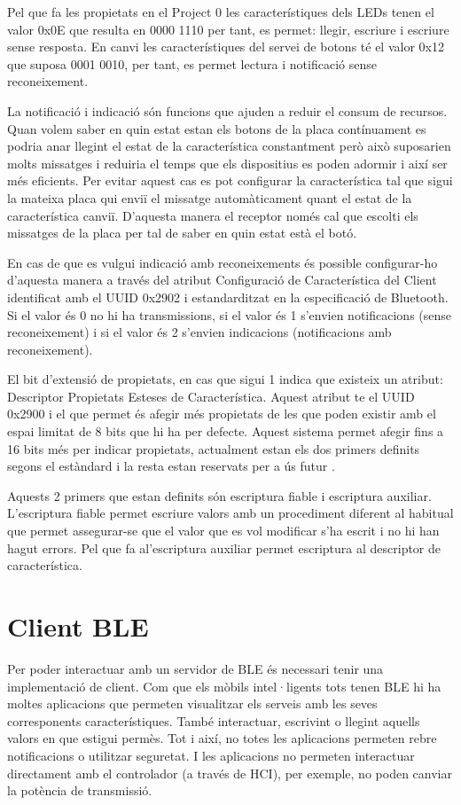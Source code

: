 Pel que fa les propietats en el Project 0 les característiques dels LEDs tenen el valor 0x0E que resulta en 0000 1110 per tant, es permet: llegir, escriure i escriure sense resposta.
En canvi les característiques del servei de botons té el valor 0x12 que suposa 0001 0010, per tant, es permet lectura i notificació sense reconeixement.

La notificació i indicació són funcions que ajuden a reduir el consum de recursos.
Quan volem saber en quin estat estan els botons de la placa contínuament es podria anar llegint el estat de la característica constantment però això suposarien molts missatges i reduiria el temps que els dispositius es poden adormir i així ser més eficients.
Per evitar aquest cas es pot configurar la característica tal que sigui la mateixa placa qui enviï el missatge automàticament quant el estat de la característica canviï.
D'aquesta manera el receptor només cal que escolti els missatges de la placa per tal de saber en quin estat està el botó.

En cas de que es vulgui indicació amb reconeixements és possible configurar-ho d'aquesta manera a través del atribut Configuració de Característica del Client identificat amb el UUID 0x2902 i estandarditzat en la especificació de Bluetooth.
Si el valor és 0 no hi ha transmissions, si el valor és 1 s'envien notificacions (sense reconeixement) i si el valor és 2 s'envien indicacions (notificacions amb reconeixement). 

El bit d'extensió de propietats, en cas que sigui 1 indica que existeix un atribut: Descriptor Propietats Esteses de Característica.
Aquest atribut te el UUID 0x2900 i el que permet és afegir més propietats de les que poden existir amb el espai limitat de 8 bits que hi ha per defecte.
Aquest sistema permet afegir fins a 16 bits més per indicar propietats, actualment estan els dos primers definits segons el estàndard i la resta estan reservats per a ús futur \cite{extended properties}.

Aquests 2 primers que estan definits són escriptura fiable i escriptura auxiliar.
L'escriptura fiable permet escriure valors amb un procediment diferent al habitual que permet assegurar-se que el valor que es vol modificar s'ha escrit i no hi han hagut errors.
Pel que fa  al'escriptura auxiliar permet escriptura al descriptor de característica. %



\section{Client BLE}
Per poder interactuar amb un servidor de BLE és necessari tenir una implementació de client.
Com que els mòbils intel·ligents tots tenen BLE hi ha moltes aplicacions que permeten visualitzar els serveis amb les seves corresponents característiques.
També interactuar, escrivint o llegint aquells valors en que estigui permès.
Tot i així, no totes les aplicacions permeten rebre notificacions o utilitzar seguretat.
I les aplicacions no permeten interactuar directament amb el controlador (a través de HCI), per exemple, no poden canviar la potència de transmissió. 

